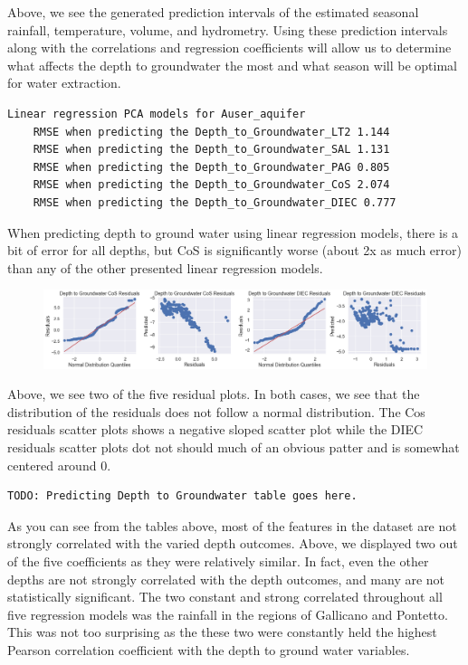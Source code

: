 \documentclass[12pt, letterpaper]{article}
\begin{document}
Above, we see the generated prediction intervals of the estimated seasonal rainfall, temperature, volume, and hydrometry. Using these prediction intervals along with the correlations and regression coefficients will allow us to determine what affects the depth to groundwater the most and what season will be optimal for water extraction.
        
\begin{verbatim}
Linear regression PCA models for Auser_aquifer
    RMSE when predicting the Depth_to_Groundwater_LT2 1.144
    RMSE when predicting the Depth_to_Groundwater_SAL 1.131
    RMSE when predicting the Depth_to_Groundwater_PAG 0.805
    RMSE when predicting the Depth_to_Groundwater_CoS 2.074
    RMSE when predicting the Depth_to_Groundwater_DIEC 0.777
\end{verbatim}

When predicting depth to ground water using linear regression models, there is a bit of error for all depths, but CoS is significantly worse (about 2x as much error) than any of the other presented linear regression models.

\begin{figure}[H]
    \includegraphics[width=1\textwidth]{aq_auser_residuals.png}
    \centering
\end{figure}

Above, we see two of the five residual plots. In both cases, we see that the distribution of the residuals does not follow a normal distribution. The Cos residuals scatter plots shows a negative sloped scatter plot while the DIEC residuals scatter plots dot not should much of an obvious patter and is somewhat centered around 0.

\begin{verbatim}
TODO: Predicting Depth to Groundwater table goes here.
\end{verbatim}

As you can see from the tables above, most of the features in the dataset are not strongly correlated with the varied depth outcomes. Above, we displayed two out of the five coefficients as they were relatively similar. In fact, even the other depths are not strongly correlated with the depth outcomes, and many are not statistically significant. The two constant and strong correlated throughout all five regression models was the rainfall in the regions of Gallicano and Pontetto. This was not too surprising as the these two were constantly held the highest Pearson correlation coefficient with the depth to ground water variables. 
\end{document}
